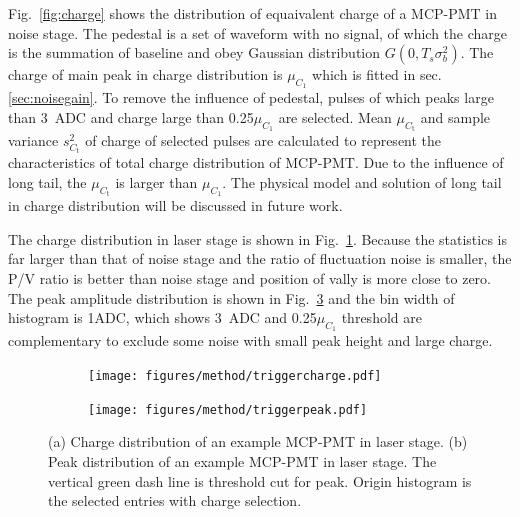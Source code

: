 Fig.~\ref{fig:charge} shows the distribution of equaivalent charge of a MCP-PMT in noise stage. The pedestal is a set of waveform with no signal, of which the charge is the summation of baseline and obey Gaussian distribution $G(0, T_s\sigma_b^2)$. The charge of main peak in charge distribution is $\mu_{C_1}$ which is fitted in sec.\ref{sec:noisegain}. To remove the influence of pedestal, pulses of which peaks large than \SI{3}{ADC} and charge large than 0.25$\mu_{C_1}$ are selected. Mean $\mu_{C_{\mathrm{t}}}$ and sample variance $s^2_{C_{\mathrm{t}}}$ of charge of selected pulses are calculated to represent the characteristics of total charge distribution of MCP-PMT. Due to the influence of long tail, the $\mu_{C_{\mathrm{t}}}$ is larger than $\mu_{C_1}$. The physical model and solution of long tail in charge distribution will be discussed in future work.

The charge distribution in laser stage is shown in Fig.~\ref{fig:triggercharge}. Because the statistics is far larger than that of noise stage and the ratio of fluctuation noise is smaller, the P/V ratio is better than noise stage and position of vally is more close to zero. The peak amplitude distribution is shown in Fig.~\ref{fig:triggerpeak} and the bin width of histogram is 1ADC, which shows \SI{3}{ADC} and 0.25$\mu_{C_1}$ threshold are complementary to exclude some noise with small peak height and large charge.

\begin{figure}[!htbp]
    \centering
    \begin{subfigure}[b]{0.4\textwidth}
        \texttt{[image: figures/method/triggercharge.pdf]}
        \caption{}%
        \label{fig:triggercharge}
    \end{subfigure}
    \begin{subfigure}[b]{0.4\textwidth}
        \texttt{[image: figures/method/triggerpeak.pdf]}
        \caption{}%
        \label{fig:triggerpeak}
    \end{subfigure}
    \caption{(a) Charge distribution of an example MCP-PMT in laser stage. (b) Peak distribution of an example MCP-PMT in laser stage. The vertical green dash line is threshold cut for peak. Origin histogram is the selected entries with charge selection.}
\end{figure}

